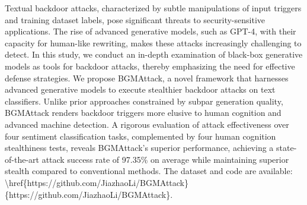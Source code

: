 Textual backdoor attacks, characterized by subtle manipulations of input triggers and training dataset labels, pose significant threats to security-sensitive applications. The rise of advanced generative models, such as GPT-4, with their capacity for human-like rewriting, makes these attacks increasingly challenging to detect. In this study, we conduct an in-depth examination of black-box generative models as tools for backdoor attacks, thereby emphasizing the need for effective defense strategies. We propose BGMAttack, a novel framework that harnesses advanced generative models to execute stealthier backdoor attacks on text classifiers. Unlike prior approaches constrained by subpar generation quality, BGMAttack renders backdoor triggers more elusive to human cognition and advanced machine detection. A rigorous evaluation of attack effectiveness over four sentiment classification tasks, complemented by four human cognition stealthiness tests, reveals BGMAttack’s superior performance, achieving a state-of-the-art attack success rate of 97.35\% on average while maintaining superior stealth compared to conventional methods. The dataset and code are available: \textbackslash{}href\{https://github.com/JiazhaoLi/BGMAttack\}\{https://github.com/JiazhaoLi/BGMAttack\}.